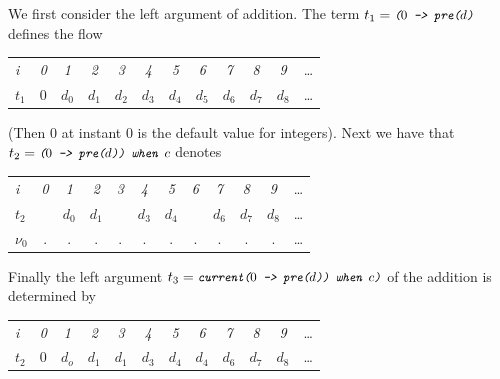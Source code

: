 {We first consider the left argument of addition.
The term $t_{1} = \emph{\texttt{\small{($0$ -> pre($d$)}}}$ defines the flow
\begin{center}
  \leavevmode
  \begin{tabular}[]{l@{\quad}||@{\quad} ccccccccccc}
    \hline\hline  
     \hbox{{\footnotesize \textit{i}}} &{\footnotesize \textit{0}}
     &{\footnotesize \textit{1}}&{\footnotesize \textit{2}}
     &{\footnotesize \textit{3}}&{\footnotesize \textit{4}}
     &{\footnotesize \textit{5}}&{\footnotesize \textit{6}}
     &{\footnotesize \textit{7}}&{\footnotesize \textit{8}}
     &{\footnotesize \textit{9}}&\ldots
   \\      
    \hbox{$t_{1}$} 
    &$0$&$d_0$&$d_1$&$d_2$&$d_3$&$d_4$&$d_5$&$d_6$&$d_7$&$d_8$&\ldots
   \\
   \hline\hline
  \end{tabular}
\end{center}
(Then $0$ at instant $0$ is the default value for integers). Next we have that $t_{2} = \emph{\texttt{\small{($0$ -> pre($d$)) when $c$}}}$ denotes
\begin{center}
  \leavevmode
  \begin{tabular}[]{l@{\quad}||@{\quad} ccccccccccc}
    \hline\hline  
     \hbox{{\footnotesize \textit{i}}} &{\footnotesize \textit{0}}
     &{\footnotesize \textit{1}}&{\footnotesize \textit{2}}
     &{\footnotesize \textit{3}}&{\footnotesize \textit{4}}
     &{\footnotesize \textit{5}}&{\footnotesize \textit{6}}
     &{\footnotesize \textit{7}}&{\footnotesize \textit{8}}
     &{\footnotesize \textit{9}}&\ldots
   \\      
    \hbox{$t_{2}$} 
    &&$d_0$&$d_1$&&$d_3$&$d_4$&&$d_6$&$d_7$&$d_8$&\ldots
   \\
    \hbox{$\nu_{0}$}  &.&.&.&.&.&.&.&.&.&.&\ldots
   \\
   \hline\hline
  \end{tabular}
\end{center}
Finally the left argument $t_{3} = \emph{\texttt{\small{current($0$ -> pre($d$)) when $c$)}}}$  of the addition is determined by
\begin{center}
  \leavevmode
  \begin{tabular}[]{l@{\quad}||@{\quad} ccccccccccc}
    \hline\hline  
     \hbox{{\footnotesize \textit{i}}} &{\footnotesize \textit{0}}
     &{\footnotesize \textit{1}}&{\footnotesize \textit{2}}
     &{\footnotesize \textit{3}}&{\footnotesize \textit{4}}
     &{\footnotesize \textit{5}}&{\footnotesize \textit{6}}
     &{\footnotesize \textit{7}}&{\footnotesize \textit{8}}
     &{\footnotesize \textit{9}}&\ldots
   \\      
    \hbox{$t_{2}$} 
    &$0$&$d_o$&$d_1$&$d_1$&$d_3$&$d_4$&$d_4$&$d_6$&$d_7$&$d_8$&\ldots
   \\
   \hline\hline
  \end{tabular}
\end{center}

}
